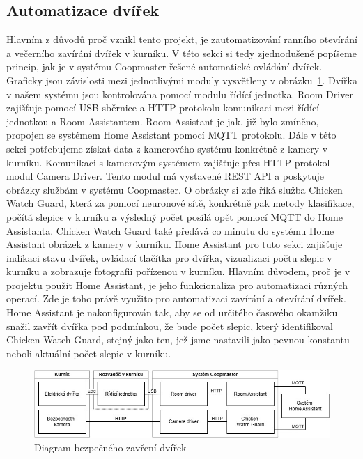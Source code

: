 \subsection{Automatizace dvířek}
Hlavním z důvodů proč vznikl tento projekt, je zautomatizování ranního otevírání a večerního zavírání dvířek v kurníku.
V této sekci si tedy zjednodušeně popíšeme princip, jak je v systému Coopmaster řešené automatické ovládání dvířek.
Graficky jsou závislosti mezi jednotlivými moduly vysvětleny v obrázku~\ref{fig:automatizace_dvirek}.\newline
Dvířka v našem systému jsou kontrolována pomocí modulu řídící jednotka.
Room Driver zajišťuje pomocí USB sběrnice a HTTP protokolu komunikaci mezi řídící jednotkou a Room Assistantem.
Room Assistant je jak, již bylo zmíněno, propojen se systémem Home Assistant pomocí MQTT protokolu.
Dále v této sekci potřebujeme získat data z kamerového systému konkrétně z kamery v kurníku.
Komunikaci s kamerovým systémem zajišťuje přes HTTP protokol modul Camera Driver.
Tento modul má vystavené REST API a poskytuje obrázky službám v systému Coopmaster.
O obrázky si zde říká služba Chicken Watch Guard, která za pomocí neuronové sítě, konkrétně pak metody klasifikace, počítá slepice v kurníku a výsledný počet posílá opět pomocí MQTT do Home Assistanta.
Chicken Watch Guard také předává co minutu do systému Home Assistant obrázek z kamery v kurníku.
Home Assistant pro tuto sekci zajišťuje indikaci stavu dvířek, ovládací tlačítka pro dvířka, vizualizaci počtu slepic v kurníku a zobrazuje fotografii pořízenou v kurníku.
Hlavním důvodem, proč je v projektu použit Home Assistant, je jeho funkcionaliza pro automatizaci různých operací.
Zde je toho právě využito pro automatizaci zavírání a otevírání dvířek.
Home Assistant je nakonfigurován tak, aby se od určitého časového okamžiku snažil zavřít dvířka pod podmínkou, že bude počet slepic, který identifikoval Chicken Watch Guard, stejný jako ten, jež jsme nastavili jako pevnou konstantu neboli aktuální počet slepic v kurníku.
\begin{figure}[h]
    \centering
    \includegraphics[width=\textwidth]{img/automatizace_dvirek}
    \caption{Diagram bezpečného zavření dvířek}
    \label{fig:automatizace_dvirek}
\end{figure}

